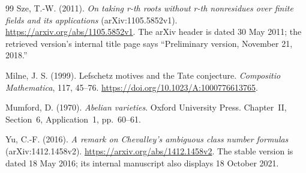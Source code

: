 \documentclass[11pt]{article}
\theoremstyle{definition}
\theoremstyle{remark}
\begin{document}
\begin{thebibliography}{99}
Sze, T.-W. (2011).
\emph{On taking r-th roots without r-th nonresidues over finite
fields and its applications} (arXiv:1105.5852v1).
\url{https://arxiv.org/abs/1105.5852v1}.
The arXiv header is dated 30 May 2011; the retrieved version's
internal title page says ``Preliminary version, November 21, 2018.''


Milne, J. S. (1999). Lefschetz motives and the Tate conjecture.
\emph{Compositio Mathematica}, 117, 45--76.
\url{https://doi.org/10.1023/A:1000776613765}.

Mumford, D. (1970). \emph{Abelian varieties}.
Oxford University Press. Chapter~II, Section~6, Application~1,
pp.~60--61.


Yu, C.-F. (2016). \emph{A remark on Chevalley's ambiguous class
number formulas} (arXiv:1412.1458v2).
\url{https://arxiv.org/abs/1412.1458v2}.
The stable version is dated 18 May 2016; its internal manuscript
also displays 18 October 2021.

\end{thebibliography}
\end{document}

